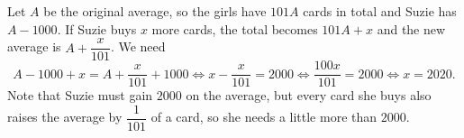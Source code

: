 Let $A$ be the original average, so the girls have $101A$ cards in total and Suzie has $A-1000$. If Suzie buys $x$ more cards, the total becomes $101A+x$ and the new average is $A+\dfrac{x}{101}$. We need
\[A-1000+x=A+\dfrac{x}{101}+1000\iff x-\dfrac{x}{101}=2000\iff\dfrac{100x}{101}=2000\iff x=\boxed{2020}.\]
Note that Suzie must gain $2000$ on the average, but every card she buys also raises the average by $\dfrac{1}{101}$ of a card, so she needs a little more than $2000$.
